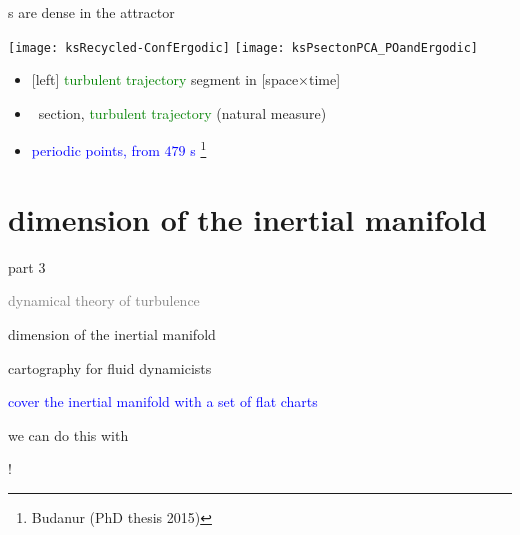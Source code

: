 \begin{frame}{\po s are dense in the attractor}
\begin{center}
\texttt{[image: ksRecycled-ConfErgodic]}
\texttt{[image: ksPsectonPCA\_POandErgodic]}
\end{center}
\begin{itemize}
  \item {[left]} \textcolor{green}{turbulent trajectory} segment in [space$\times$time]
  \item \Poincare\ section, \textcolor{green}{turbulent trajectory} (natural measure)
  \item \textcolor{blue}{periodic points, from $479$ \po s}%
\footnote{\footnotesize
Budanur (PhD thesis 2015)}
\end{itemize}

\end{frame}

\section[dimension of the inertial manifold]
{dimension of the inertial manifold}

\begin{frame}{part 3}
\begin{enumerate}
              \item
    \textcolor{gray}{\small
dynamical theory of turbulence
              \item
\statesp
    }
              \item
    {\Large
dimension of the inertial manifold
                    }
            \end{enumerate}
\end{frame}


\begin{frame}{cartography for fluid dynamicists}
\bigskip

\textcolor{blue}{cover the inertial manifold with a set of flat charts}

\hfill
\vfill
we can do this with

\hfill {}!
\end{frame}

